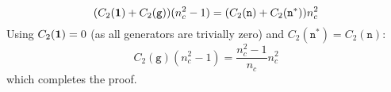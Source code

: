 \begin{equation*}
  (C_2(\mathbf{1}) + C_2(\mathtt{g})) (n_c^2 - 1) = (C_2(\mathtt{n}) + C_2(\mathtt{n}^*)) n_c^2
\end{equation*}
Using $ C_2(\mathbf{1}) = 0 $ (as all generators are trivially zero) and $ C_2(\mathtt{n}^*) = C_2(\mathtt{n}) $:
\begin{equation*}
  C_2(\mathtt{g}) (n_c^2 - 1) = \frac{n_c^2 - 1}{n_c} n_c^2
\end{equation*}
which completes the proof.










